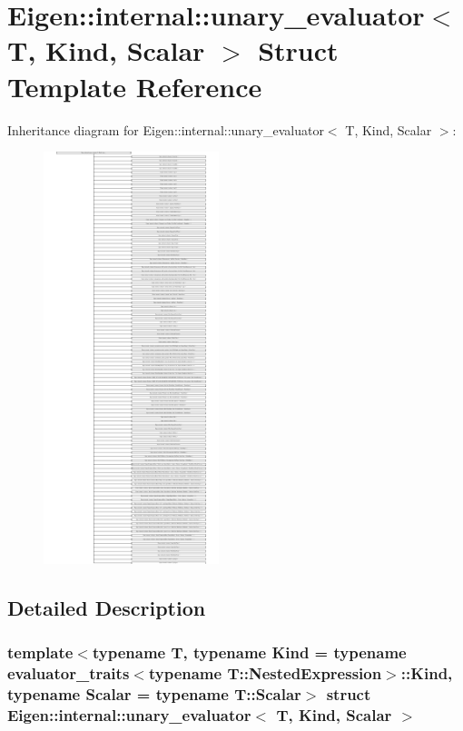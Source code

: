 \hypertarget{struct_eigen_1_1internal_1_1unary__evaluator}{}\section{Eigen\+:\+:internal\+:\+:unary\+\_\+evaluator$<$ T, Kind, Scalar $>$ Struct Template Reference}
\label{struct_eigen_1_1internal_1_1unary__evaluator}
Inheritance diagram for Eigen\+:\+:internal\+:\+:unary\+\_\+evaluator$<$ T, Kind, Scalar $>$\+:\begin{figure}[H]
\begin{center}
\leavevmode
\includegraphics[height=12.000000cm]{struct_eigen_1_1internal_1_1unary__evaluator}
\end{center}
\end{figure}


\subsection{Detailed Description}
\subsubsection*{template$<$typename T, typename Kind = typename evaluator\+\_\+traits$<$typename T\+::\+Nested\+Expression$>$\+::\+Kind, typename Scalar = typename T\+::\+Scalar$>$\newline
struct Eigen\+::internal\+::unary\+\_\+evaluator$<$ T, Kind, Scalar $>$}



